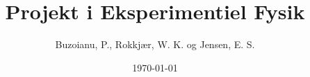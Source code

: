 \documentclass[a4paper,oneside,article]{memoir}
\author{Buzoianu, P., Rokkjær, W. K. og Jensen, E. S.}
\title{Projekt i Eksperimentiel Fysik}
\date{\today}
\begin{document}
    \frontmatter
    

    \tableofcontents*

    \mainmatter
    
    
    
    
    
    
    
\end{document}
